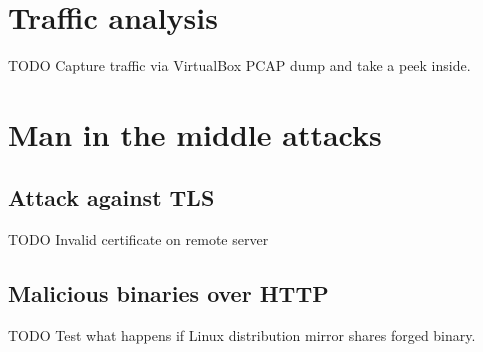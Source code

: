 
\section{Traffic analysis}

TODO Capture traffic via VirtualBox PCAP dump and take a peek inside.

\section{Man in the middle attacks}

\subsection{Attack against TLS}

TODO Invalid certificate on remote server

\subsection{Malicious binaries over HTTP}

TODO Test what happens if Linux distribution mirror shares forged binary.
